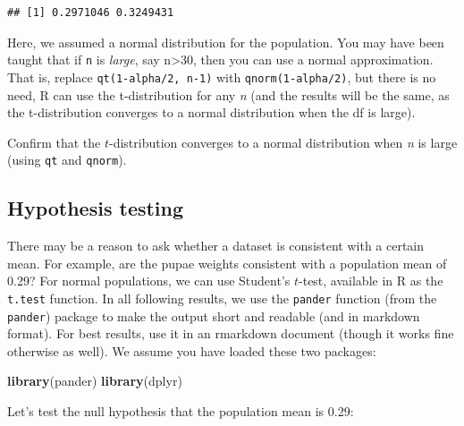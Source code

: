 \documentclass[]{book}
\newenvironment{Shaded}{\begin{snugshade}}{\end{snugshade}}
\newcommand{\DataTypeTok}[1]{\textcolor[rgb]{0.13,0.29,0.53}{#1}}
\newcommand{\FloatTok}[1]{\textcolor[rgb]{0.00,0.00,0.81}{#1}}
\newcommand{\KeywordTok}[1]{\textcolor[rgb]{0.13,0.29,0.53}{\textbf{#1}}}
\newcommand{\NormalTok}[1]{#1}
\newcommand{\OperatorTok}[1]{\textcolor[rgb]{0.81,0.36,0.00}{\textbf{#1}}}
\newcommand{\StringTok}[1]{\textcolor[rgb]{0.31,0.60,0.02}{#1}}
\let\BeginKnitrBlock\begin \let\EndKnitrBlock\end
\begin{document}
\begin{verbatim}
## [1] 0.2971046 0.3249431
\end{verbatim}

Here, we assumed a normal distribution for the population. You may have been taught that if \texttt{n} is \emph{large}, say n\textgreater{}30, then you can use a normal approximation. That is, replace \texttt{qt(1-alpha/2,\ n-1)} with \texttt{qnorm(1-alpha/2)}, but there is no need, R can use the t-distribution for any \emph{n} (and the results will be the same, as the t-distribution converges to a normal distribution when the df is large).

\BeginKnitrBlock{rmdtry}
Confirm that the \(t\)-distribution converges to a normal distribution when \emph{n} is large (using \texttt{qt} and \texttt{qnorm}).
\EndKnitrBlock{rmdtry}

\hypertarget{inference}{%
\subsection{Hypothesis testing}\label{inference}}

There may be a reason to ask whether a dataset is consistent with a certain mean. For example, are the pupae weights consistent with a population mean of 0.29? For normal populations, we can use Student's \(t\)-test, available in R as the \texttt{t.test} function. In all following results, we use the \texttt{pander} function (from the \texttt{pander}) package to make the output short and readable (and in markdown format). For best results, use it in an rmarkdown document (though it works fine otherwise as well). We assume you have loaded these two packages:

\begin{Shaded}
\begin{Highlighting}[]
\KeywordTok{library}\NormalTok{(pander)}
\KeywordTok{library}\NormalTok{(dplyr)}
\end{Highlighting}
\end{Shaded}

Let's test the null hypothesis that the population mean is 0.29:

\begin{Shaded}
\end{Shaded}
\end{document}
